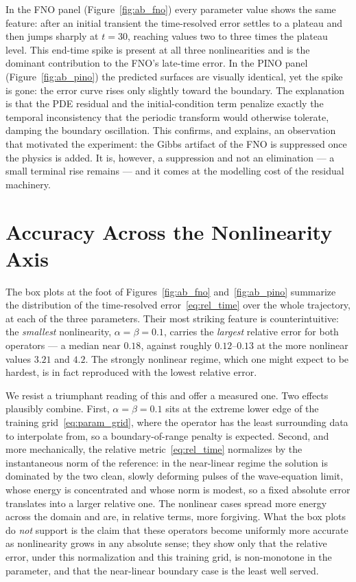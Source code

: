 In the FNO panel (Figure~\ref{fig:ab_fno}) every parameter value shows the same feature: after an initial transient the time-resolved error settles to a plateau and then jumps sharply at $t = 30$, reaching values two to three times the plateau level. This end-time spike is present at all three nonlinearities and is the dominant contribution to the FNO's late-time error. In the PINO panel (Figure~\ref{fig:ab_pino}) the predicted surfaces are visually identical, yet the spike is gone: the error curve rises only slightly toward the boundary. The explanation is that the PDE residual and the initial-condition term penalize exactly the temporal inconsistency that the periodic transform would otherwise tolerate, damping the boundary oscillation. This confirms, and explains, an observation that motivated the experiment: the Gibbs artifact of the FNO is suppressed once the physics is added. It is, however, a suppression and not an elimination --- a small terminal rise remains --- and it comes at the modelling cost of the residual machinery.

\section{Accuracy Across the Nonlinearity Axis}
\label{sec:res_nonlinearity}

The box plots at the foot of Figures~\ref{fig:ab_fno} and~\ref{fig:ab_pino} summarize the distribution of the time-resolved error~\eqref{eq:rel_time} over the whole trajectory, at each of the three parameters. Their most striking feature is counterintuitive: the \emph{smallest} nonlinearity, $\alpha = \beta = 0.1$, carries the \emph{largest} relative error for both operators --- a median near $0.18$, against roughly $0.12$--$0.13$ at the more nonlinear values $3.21$ and $4.2$. The strongly nonlinear regime, which one might expect to be hardest, is in fact reproduced with the lowest relative error.

We resist a triumphant reading of this and offer a measured one. Two effects plausibly combine. First, $\alpha = \beta = 0.1$ sits at the extreme lower edge of the training grid~\eqref{eq:param_grid}, where the operator has the least surrounding data to interpolate from, so a boundary-of-range penalty is expected. Second, and more mechanically, the relative metric~\eqref{eq:rel_time} normalizes by the instantaneous norm of the reference: in the near-linear regime the solution is dominated by the two clean, slowly deforming pulses of the wave-equation limit, whose energy is concentrated and whose norm is modest, so a fixed absolute error translates into a larger relative one. The nonlinear cases spread more energy across the domain and are, in relative terms, more forgiving. What the box plots do \emph{not} support is the claim that these operators become uniformly more accurate as nonlinearity grows in any absolute sense; they show only that the relative error, under this normalization and this training grid, is non-monotone in the parameter, and that the near-linear boundary case is the least well served.

